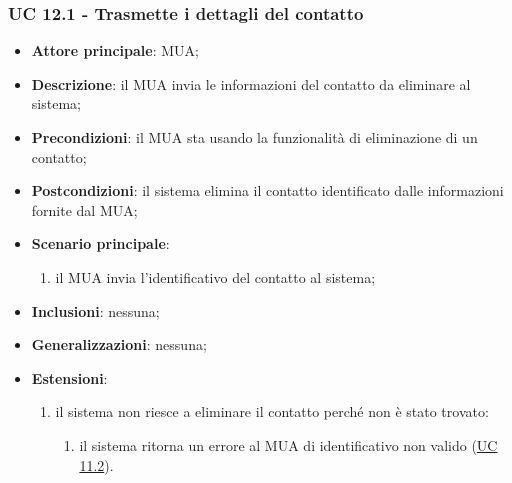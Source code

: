 \subsubsection{UC 12.1 - Trasmette i dettagli del contatto} \label{sec:UC12.1}
    \begin{itemize}
        \item \textbf{Attore principale}: MUA;
        \item \textbf{Descrizione}: il MUA invia le informazioni del contatto da eliminare al sistema;
        \item \textbf{Precondizioni}: il MUA sta usando la funzionalità di eliminazione di un contatto;
        \item \textbf{Postcondizioni}: il sistema elimina il contatto identificato dalle informazioni fornite dal MUA;
        \item \textbf{Scenario principale}:
            \begin{enumerate}
                \item il MUA invia l'identificativo del contatto al sistema;
            \end{enumerate}
        \item \textbf{Inclusioni}: nessuna;
        \item \textbf{Generalizzazioni}: nessuna;
        \item \textbf{Estensioni}:
            \begin{enumerate}[label=\alph*.]
                \item il sistema non riesce a eliminare il contatto perché non è stato trovato:
                \begin{enumerate}[label=\arabic*.]
                    \item il sistema ritorna un errore al MUA di identificativo non valido (\hyperref[sec:UC11.2]{UC 11.2}).
                \end{enumerate}
            \end{enumerate}
    \end{itemize}


